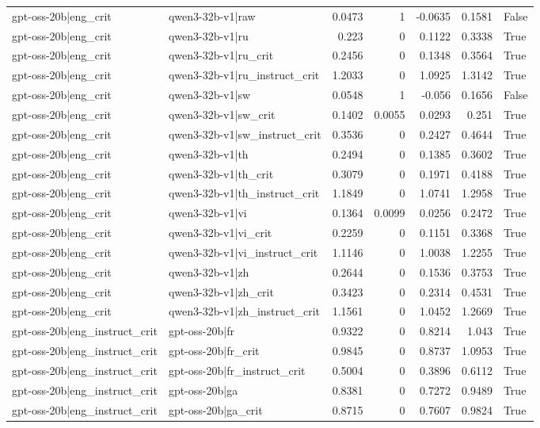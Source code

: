 \begin{table}
\begin{tabular}{l l r r r r l}
gpt-oss-20b|eng_crit & qwen3-32b-v1|raw & 0.0473 & 1 & -0.0635 & 0.1581 & False \\
gpt-oss-20b|eng_crit & qwen3-32b-v1|ru & 0.223 & 0 & 0.1122 & 0.3338 & True \\
gpt-oss-20b|eng_crit & qwen3-32b-v1|ru_crit & 0.2456 & 0 & 0.1348 & 0.3564 & True \\
gpt-oss-20b|eng_crit & qwen3-32b-v1|ru_instruct_crit & 1.2033 & 0 & 1.0925 & 1.3142 & True \\
gpt-oss-20b|eng_crit & qwen3-32b-v1|sw & 0.0548 & 1 & -0.056 & 0.1656 & False \\
gpt-oss-20b|eng_crit & qwen3-32b-v1|sw_crit & 0.1402 & 0.0055 & 0.0293 & 0.251 & True \\
gpt-oss-20b|eng_crit & qwen3-32b-v1|sw_instruct_crit & 0.3536 & 0 & 0.2427 & 0.4644 & True \\
gpt-oss-20b|eng_crit & qwen3-32b-v1|th & 0.2494 & 0 & 0.1385 & 0.3602 & True \\
gpt-oss-20b|eng_crit & qwen3-32b-v1|th_crit & 0.3079 & 0 & 0.1971 & 0.4188 & True \\
gpt-oss-20b|eng_crit & qwen3-32b-v1|th_instruct_crit & 1.1849 & 0 & 1.0741 & 1.2958 & True \\
gpt-oss-20b|eng_crit & qwen3-32b-v1|vi & 0.1364 & 0.0099 & 0.0256 & 0.2472 & True \\
gpt-oss-20b|eng_crit & qwen3-32b-v1|vi_crit & 0.2259 & 0 & 0.1151 & 0.3368 & True \\
gpt-oss-20b|eng_crit & qwen3-32b-v1|vi_instruct_crit & 1.1146 & 0 & 1.0038 & 1.2255 & True \\
gpt-oss-20b|eng_crit & qwen3-32b-v1|zh & 0.2644 & 0 & 0.1536 & 0.3753 & True \\
gpt-oss-20b|eng_crit & qwen3-32b-v1|zh_crit & 0.3423 & 0 & 0.2314 & 0.4531 & True \\
gpt-oss-20b|eng_crit & qwen3-32b-v1|zh_instruct_crit & 1.1561 & 0 & 1.0452 & 1.2669 & True \\
gpt-oss-20b|eng_instruct_crit & gpt-oss-20b|fr & 0.9322 & 0 & 0.8214 & 1.043 & True \\
gpt-oss-20b|eng_instruct_crit & gpt-oss-20b|fr_crit & 0.9845 & 0 & 0.8737 & 1.0953 & True \\
gpt-oss-20b|eng_instruct_crit & gpt-oss-20b|fr_instruct_crit & 0.5004 & 0 & 0.3896 & 0.6112 & True \\
gpt-oss-20b|eng_instruct_crit & gpt-oss-20b|ga & 0.8381 & 0 & 0.7272 & 0.9489 & True \\
gpt-oss-20b|eng_instruct_crit & gpt-oss-20b|ga_crit & 0.8715 & 0 & 0.7607 & 0.9824 & True \\

\end{tabular}
\end{table}
